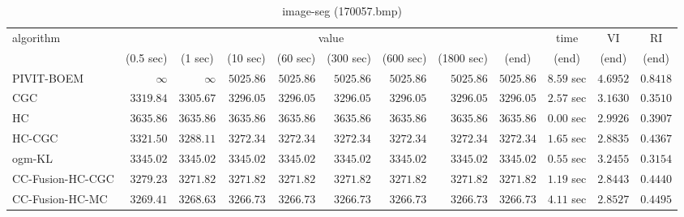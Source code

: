 \begin{table}[H]
\scriptsize
\centering
\caption{image-seg (170057.bmp)}
\label{tab:anytimetable-image-seg-170057.bmp}
\begin{tabular}{lrrrrrrrrrrr}
\toprule
           algorithm &                                   \multicolumn{8}{c}{value} & \multicolumn{1}{c}{time}    & \multicolumn{1}{c}{VI}  & \multicolumn{1}{c}{RI} \\  
\cmidrule(lr){2-9}\cmidrule(lr){10-10} \cmidrule(lr){11-11} \cmidrule(lr){12-12}   
                     & \multicolumn{1}{c}{(0.5 sec)} & \multicolumn{1}{c}{(1 sec)} & \multicolumn{1}{c}{(10 sec)} & \multicolumn{1}{c}{(60 sec)} & \multicolumn{1}{c}{(300 sec)} & \multicolumn{1}{c}{(600 sec)} & \multicolumn{1}{c}{(1800 sec)} & \multicolumn{1}{c}{(end)} & \multicolumn{1}{c}{(end)}    & \multicolumn{1}{c}{(end)}   & \multicolumn{1}{c}{(end)}  \\ \midrule 
          PIVIT-BOEM & $\infty$ & $\infty$ & $      5025.86$ & $      5025.86$ & $      5025.86$ & $      5025.86$ & $      5025.86$ & $      5025.86$ & $         8.59$ sec    & $       4.6952$  & $       0.8418$ \\ 
                 CGC & $      3319.84$ & $      3305.67$ & $      3296.05$ & $      3296.05$ & $      3296.05$ & $      3296.05$ & $      3296.05$ & $      3296.05$ & $         2.57$ sec    & $       3.1630$  & $       0.3510$ \\ 
                  HC & $      3635.86$ & $      3635.86$ & $      3635.86$ & $      3635.86$ & $      3635.86$ & $      3635.86$ & $      3635.86$ & $      3635.86$ & $         0.00$ sec    & $       2.9926$  & $       0.3907$ \\ 
              HC-CGC & $      3321.50$ & $      3288.11$ & $      3272.34$ & $      3272.34$ & $      3272.34$ & $      3272.34$ & $      3272.34$ & $      3272.34$ & $         1.65$ sec    & $       2.8835$  & $       0.4367$ \\ 
              ogm-KL & $      3345.02$ & $      3345.02$ & $      3345.02$ & $      3345.02$ & $      3345.02$ & $      3345.02$ & $      3345.02$ & $      3345.02$ & $         0.55$ sec    & $       3.2455$  & $       0.3154$ \\ 
    CC-Fusion-HC-CGC & $      3279.23$ & $      3271.82$ & $      3271.82$ & $      3271.82$ & $      3271.82$ & $      3271.82$ & $      3271.82$ & $      3271.82$ & $         1.19$ sec    & $       2.8443$  & $       0.4440$ \\ 
     CC-Fusion-HC-MC & $      3269.41$ & $      3268.63$ & $      3266.73$ & $      3266.73$ & $      3266.73$ & $      3266.73$ & $      3266.73$ & $      3266.73$ & $         4.11$ sec    & $       2.8527$  & $       0.4495$ \\ 

\end{tabular}
\end{table}
